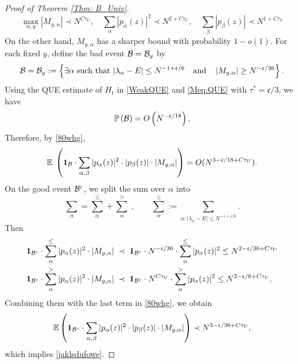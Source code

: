 \documentclass[10pt,reqno]{article}
\theoremstyle{plain} %
\theoremstyle{remark}
\numberwithin{equation}{section}
\begin{document}
\begin{proof}[Proof of Theorem \ref{Thm: B_Univ}]
\begin{equation}
       \max_{\alpha,y} |M_{y,\alpha}|\prec  N^{C\tau_U},\quad  \sum_{\alpha } |p_\alpha(z)|^2 \prec N^{2+C\tau_U},\quad  \sum_{ \beta}    |p_\beta(z)|\prec N^{1+C\tau_U}
\end{equation} 
On the other hand,  $M_{y,\alpha}$ has a sharper bound  with probability $1-o(1)$. 
For each fixed $y$, define the bad event \({\cal B}={\cal B}_y\) by 
$$
{\cal B}={\cal B}_y:=\left\{\exists \alpha \mbox { such that } |\lambda_\alpha-E|\le N^{-1+\mathfrak c/6} \quad \mbox{and} \quad \left| M_{y,\alpha}\right|\ge N^{-\mathfrak c/36}\right\}.
$$
Using the QUE estimate of $H_t$ in \eqref{WeakQUE} and \eqref{Meq:QUE} with $\tau^*=\mathfrak c/3$, we have 
$$
\mathbb P\left({\cal B} \right)=O\left(N^{-\mathfrak c/18}\right). 
$$
Therefore, by  \eqref{80whg}, 
$$
\mathbb E\; \left( {\bf 1}_{{\cal B} }\cdot \sum_{\alpha,\beta} |p_\alpha(z)|^2 \cdot |p_\beta(z)|\cdot \left| M_{y,\alpha} \right| \right)
=O( N^{3-\mathfrak c/18+C\tau_U} ).
$$
On the good  event ${\cal B}^c $, we split the sum over $\alpha$ into 
$$
\sum_{\alpha }= \sum^{\le} _{\alpha }+\sum^{>} _{\alpha }\;,\quad \quad \sum^{\le} _{\alpha }:=\sum_{\alpha: |\lambda_\alpha-E|\le N^{-1+\mathfrak c/6}} .
$$
Then
\begin{align}
{\bf 1}_{{\cal B}^c }\cdot \sum_{\alpha } ^{\le}|p_\alpha(z)|^2  \cdot \left| M_{y,\alpha} \right|& \; \prec \;
{\bf 1}_{{\cal B}^c }\cdot N^{-\mathfrak c/36}\cdot  \sum_{\alpha } ^{\le} |p_\alpha(z)|^2  \le N^{2-\mathfrak c/36+C\tau_U} 
\\\nonumber
{\bf 1}_{{\cal B}^c }\cdot \sum_{\alpha } ^{>}|p_\alpha(z)|^2  \cdot \left| M_{y,\alpha} \right|  &\; \prec \;
{\bf 1}_{{\cal B}^c }\cdot N^{C\tau_U}\cdot  \sum_{\alpha } ^{>} |p_\alpha(z)|^2  \le N^{2-\mathfrak c/6+C\tau_U} .
 \end{align}
 Combining  them with the last term in \eqref{80whg},  we obtain 
$$
\mathbb E \left({\bf 1}_{{\cal B}^c }\cdot \sum_{\alpha,\beta} |p_\alpha(z)|^2 \cdot |p_\beta(z)|\cdot \left| M_{y,\alpha} \right|\right) 
\prec  N^{3-\mathfrak c/36+C\tau_U} , 
$$
which implies  \eqref{jaklsdufowe}. 

 


\end{proof}
\end{document}
